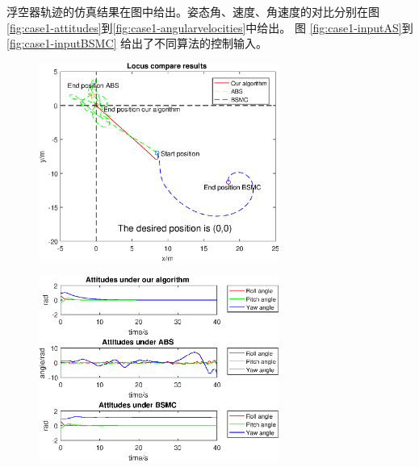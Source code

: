 浮空器轨迹的仿真结果在图中给出。姿态角、速度、角速度的对比分别在图 \ref{fig:case1-attitudes}到\ref{fig:case1-angularvelocities}中给出。 图 \ref{fig:case1-inputAS}到\ref{fig:case1-inputBSMC} 给出了不同算法的控制输入。

\begin{figure}[!htp]
    \centering
    \includegraphics[width=0.7\textwidth]{figure/chap03/case1-locus.eps}
\end{figure}
\begin{figure}[!htp]
    \centering
    \includegraphics[width=0.7\textwidth,clip]{figure/chap03/case1-attitudes.eps}
\end{figure}
